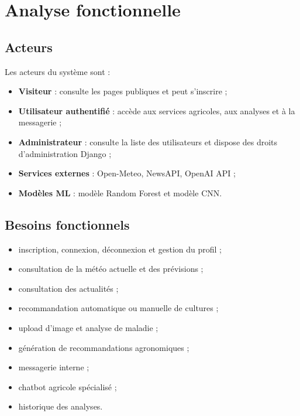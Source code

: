 \documentclass[12pt,a4paper]{report}
\begin{document}
\chapter{Analyse fonctionnelle}

\section{Acteurs}
Les acteurs du système sont :
\begin{itemize}[noitemsep]
  \item \textbf{Visiteur} : consulte les pages publiques et peut s'inscrire ;
  \item \textbf{Utilisateur authentifié} : accède aux services agricoles, aux analyses et à la messagerie ;
  \item \textbf{Administrateur} : consulte la liste des utilisateurs et dispose des droits d'administration Django ;
  \item \textbf{Services externes} : Open-Meteo, NewsAPI, OpenAI API ;
  \item \textbf{Modèles ML} : modèle Random Forest et modèle CNN.
\end{itemize}

\section{Besoins fonctionnels}
\begin{itemize}[noitemsep]
  \item inscription, connexion, déconnexion et gestion du profil ;
  \item consultation de la météo actuelle et des prévisions ;
  \item consultation des actualités ;
  \item recommandation automatique ou manuelle de cultures ;
  \item upload d'image et analyse de maladie ;
  \item génération de recommandations agronomiques ;
  \item messagerie interne ;
  \item chatbot agricole spécialisé ;
  \item historique des analyses.
\end{itemize}
\end{document}
